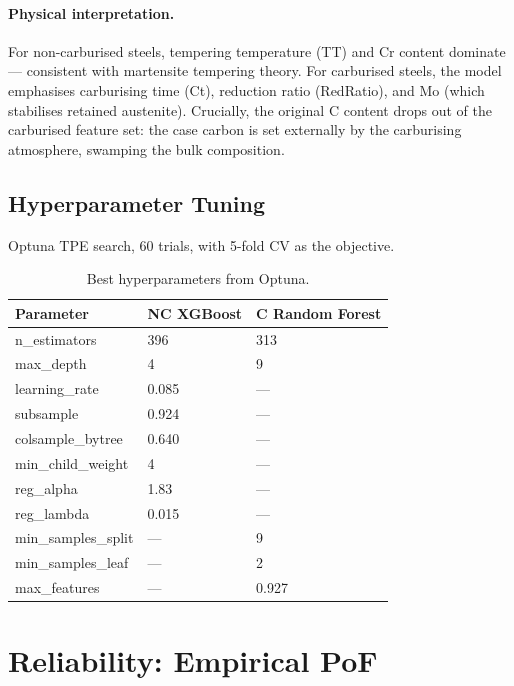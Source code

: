 \documentclass[12pt,a4paper]{article}
\begin{document}
\paragraph{Physical interpretation.} For non-carburised steels, tempering temperature (TT)
and Cr content dominate — consistent with martensite tempering theory. For carburised
steels, the model emphasises carburising time (Ct), reduction ratio (RedRatio), and Mo
(which stabilises retained austenite). Crucially, the original C content drops out of the
carburised feature set: the case carbon is set externally by the carburising atmosphere,
swamping the bulk composition.

\subsection{Hyperparameter Tuning}
Optuna TPE search, 60 trials, with 5-fold CV as the objective.

\begin{table}[H]
\centering
\caption{Best hyperparameters from Optuna.}
\label{tab:hparams}
\begin{tabular}{lll}
\toprule
\textbf{Parameter} & \textbf{NC XGBoost} & \textbf{C Random Forest} \\
\midrule
n\_estimators       & 396                 & 313 \\
max\_depth          & 4                   & 9 \\
learning\_rate      & 0.085               & --- \\
subsample           & 0.924               & --- \\
colsample\_bytree   & 0.640               & --- \\
min\_child\_weight  & 4                   & --- \\
reg\_alpha          & 1.83                & --- \\
reg\_lambda         & 0.015               & --- \\
min\_samples\_split & ---                 & 9 \\
min\_samples\_leaf  & ---                 & 2 \\
max\_features       & ---                 & 0.927 \\
\bottomrule
\end{tabular}
\end{table}


\section{Reliability: Empirical PoF}\label{sec:reliability}
\end{document}
